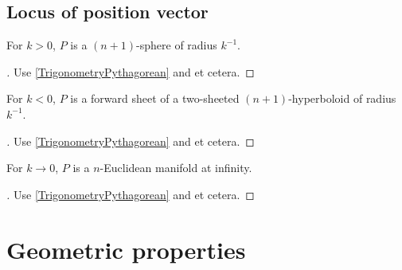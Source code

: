 \documentclass[stu, babel, american, biblatex, a4paper, leqno, draftall]{apa7}
\begin{document}
\subsection{Locus of position vector}
\begin{lemma}\label{SphericalLocus}
    For $k>0$, $P$ is a $\left(n+1\right)$-sphere of radius $k^{-1}$.
\end{lemma}
\begin{proof}[]
    \skipped

    Use \cref{TrigonometryPythagorean} and et cetera.
\end{proof}
\begin{lemma}\label{HyperbolicLocus}
    For $k<0$, $P$ is a forward sheet of a two-sheeted $\left(n+1\right)$-hyperboloid of radius $k^{-1}$.
\end{lemma}
\begin{proof}[]
    \skipped

    Use \cref{TrigonometryPythagorean} and et cetera.
\end{proof}
\begin{lemma}\label{EuclideanLocus}
    For $k\to0$, $P$ is a $n$-Euclidean manifold at infinity.
\end{lemma}
\begin{proof}[]
    \skipped

    Use \cref{TrigonometryPythagorean} and et cetera.
\end{proof}
\section{Geometric properties}
\end{document}
